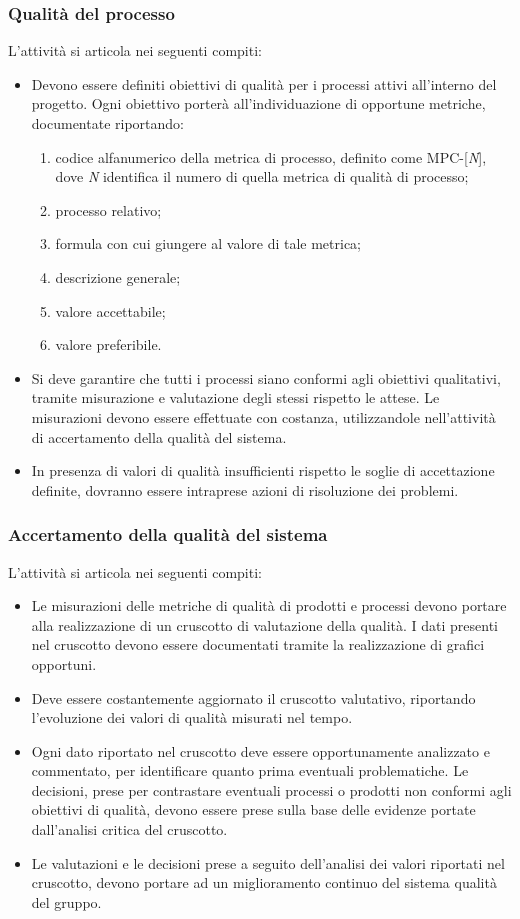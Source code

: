 \subsubsection{Qualità del processo}
L'attività si articola nei seguenti compiti:
\begin{itemize}
    \item Devono essere definiti obiettivi di qualità per i processi attivi all'interno del progetto. Ogni obiettivo porterà all'individuazione di opportune metriche, documentate riportando:
    \begin{enumerate}
        \item codice alfanumerico della metrica di processo, definito come MPC-[\textit{N}], dove \textit{N} identifica il numero di quella metrica di qualità di processo;
        \item processo relativo;
        \item formula con cui giungere al valore di tale metrica;
        \item descrizione generale;
        \item valore accettabile;
        \item valore preferibile.
    \end{enumerate}
    \item Si deve garantire che tutti i processi siano conformi agli obiettivi qualitativi, tramite misurazione e valutazione degli stessi rispetto le attese. Le misurazioni devono essere effettuate con costanza, utilizzandole nell'attività di accertamento della qualità del sistema.
    \item In presenza di valori di qualità insufficienti rispetto le soglie di accettazione definite, dovranno essere intraprese azioni di risoluzione dei problemi.
\end{itemize}

\subsubsection{Accertamento della qualità del sistema}
L'attività si articola nei seguenti compiti:
\begin{itemize}
    \item Le misurazioni delle metriche di qualità di prodotti e processi devono portare alla realizzazione di un cruscotto di valutazione della qualità. I dati presenti nel cruscotto devono essere documentati tramite la realizzazione di grafici opportuni.
    \item Deve essere costantemente aggiornato il cruscotto valutativo, riportando l'evoluzione dei valori di qualità misurati nel tempo.
    \item Ogni dato riportato nel cruscotto deve essere opportunamente analizzato e commentato, per identificare quanto prima eventuali problematiche. Le decisioni, prese per contrastare eventuali processi o prodotti non conformi agli obiettivi di qualità, devono essere prese sulla base delle evidenze portate dall'analisi critica del cruscotto.
    \item Le valutazioni e le decisioni prese a seguito dell'analisi dei valori riportati nel cruscotto, devono portare ad un miglioramento continuo del sistema qualità del gruppo.
\end{itemize}

